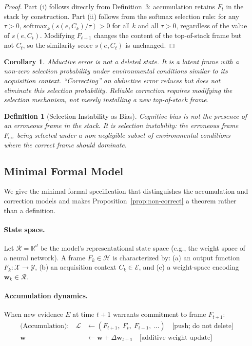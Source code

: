 \documentclass[12pt]{article}
\newtheorem{definition}{Definition}
\newtheorem{corollary}{Corollary}
\begin{document}
\begin{proof}
Part (i) follows directly from Definition~3: accumulation retains
$F_t$ in the stack by construction.
Part (ii) follows from the softmax selection rule: for any $\tau > 0$,
$\mathrm{softmax}_k(s(e, C_k)/\tau) > 0$ for all $k$ and
all $\tau > 0$, regardless of the value of $s(e, C_t)$.
Modifying $F_{t+1}$ changes the content of the top-of-stack frame
but not $C_t$, so the similarity score $s(e, C_t)$ is unchanged.
\end{proof}

\begin{corollary}
Abductive error is not a deleted state.
It is a latent frame with a non-zero selection probability under
environmental conditions similar to its acquisition context.
``Correcting'' an abductive error reduces but does not eliminate
this selection probability.
Reliable correction requires modifying the selection mechanism,
not merely installing a new top-of-stack frame.
\end{corollary}

\begin{definition}[Selection Instability as Bias]
\emph{Cognitive bias} is not the presence of an erroneous frame
in the stack.
It is \emph{selection instability}: the erroneous frame $F_\mathrm{err}$
being selected under a non-negligible subset of environmental
conditions where the correct frame should dominate.
\end{definition}

\subsection{Minimal Formal Model}
\label{sec:minimal-model}

We give the minimal formal specification that distinguishes the
accumulation and correction models and makes Proposition~\ref{prop:non-correct}
a theorem rather than a definition.

\paragraph{State space.}
Let $\mathcal{R} = \mathbb{R}^d$ be the model's representational
state space (e.g., the weight space of a neural network).
A frame $F_k \in \mathcal{H}$ is characterized by:
(a) an output function $F_k: \mathcal{X} \to \mathcal{Y}$,
(b) an acquisition context $C_k \in \mathcal{E}$, and
(c) a weight-space encoding $\mathbf{w}_k \in \mathcal{R}$.

\paragraph{Accumulation dynamics.}
When new evidence $E$ at time $t+1$ warrants commitment to frame $F_{t+1}$:
\begin{align*}
\text{(Accumulation):} \quad
\mathcal{L} &\leftarrow (F_{t+1},\; F_t,\; F_{t-1},\; \ldots)
\quad \text{[push; do not delete]}\\
\mathbf{w} &\leftarrow \mathbf{w} + \Delta\mathbf{w}_{t+1}
\quad \text{[additive weight update]}
\end{align*}
\end{document}
